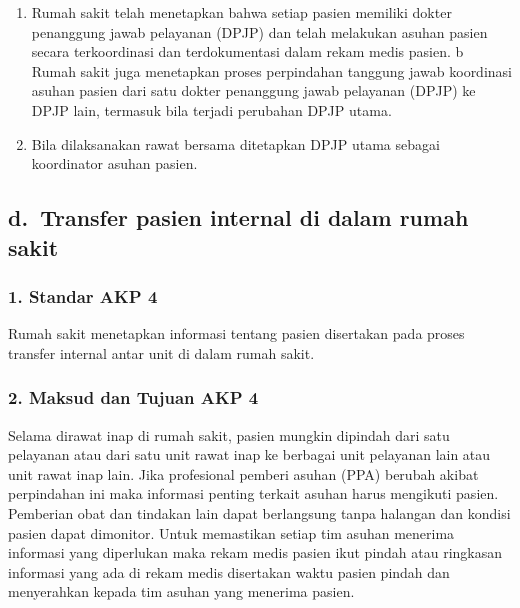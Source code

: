 \documentclass[
]{book}
\providecommand{\tightlist}{%
  \setlength{\itemsep}{0pt}\setlength{\parskip}{0pt}}
\begin{document}
\begin{enumerate}
\def\labelenumi{\alph{enumi}.}
\tightlist
\item
  Rumah sakit telah menetapkan bahwa setiap pasien memiliki dokter penanggung jawab pelayanan (DPJP) dan telah melakukan asuhan pasien secara terkoordinasi dan terdokumentasi dalam rekam medis pasien.
  b Rumah sakit juga menetapkan proses perpindahan tanggung jawab koordinasi asuhan pasien dari satu dokter penanggung jawab pelayanan (DPJP) ke DPJP lain, termasuk bila terjadi perubahan DPJP utama.
\item
  Bila dilaksanakan rawat bersama ditetapkan DPJP utama sebagai koordinator asuhan pasien.
\end{enumerate}

\hypertarget{d.-transfer-pasien-internal-di-dalam-rumah-sakit}{%
\subsection*{d.~Transfer pasien internal di dalam rumah sakit}\label{d.-transfer-pasien-internal-di-dalam-rumah-sakit}}

\hypertarget{standar-akp-4}{%
\subsubsection*{1. Standar AKP 4}\label{standar-akp-4}}

Rumah sakit menetapkan informasi tentang pasien disertakan pada proses transfer internal antar unit di dalam rumah sakit.

\hypertarget{maksud-dan-tujuan-akp-4}{%
\subsubsection*{2. Maksud dan Tujuan AKP 4}\label{maksud-dan-tujuan-akp-4}}

Selama dirawat inap di rumah sakit, pasien mungkin dipindah dari satu pelayanan atau dari satu unit rawat inap ke berbagai unit pelayanan lain atau unit rawat inap lain. Jika profesional pemberi asuhan (PPA) berubah akibat perpindahan ini maka informasi penting terkait asuhan harus mengikuti pasien. Pemberian obat dan tindakan lain dapat berlangsung tanpa halangan dan kondisi pasien dapat dimonitor. Untuk memastikan setiap tim asuhan menerima informasi yang diperlukan maka rekam medis pasien ikut pindah atau ringkasan informasi yang ada di rekam medis disertakan waktu pasien pindah dan menyerahkan kepada tim asuhan yang menerima pasien.
\end{document}
